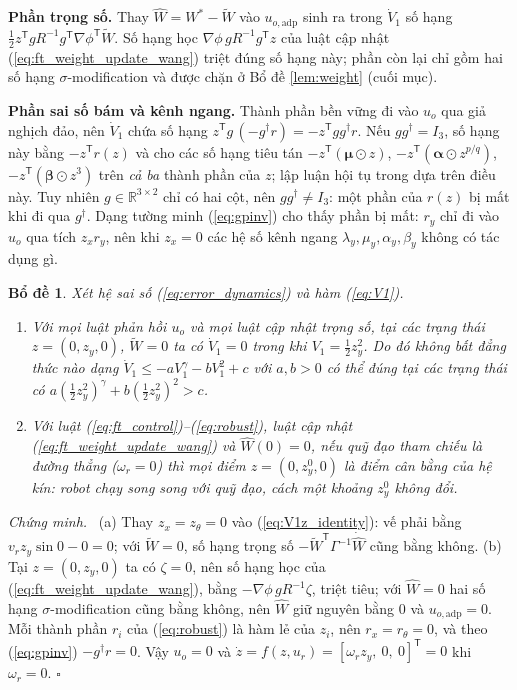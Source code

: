\documentclass[12pt,a4paper]{article}
\newtheorem{bode}{Bổ đề}
\newenvironment{chungminh}{\par\noindent\textit{Chứng minh.}\ }{\hfill$\square$\par\medskip}
\newcommand{\R}{\mathbb{R}}
\newcommand{\T}{\mathsf{T}}
\begin{document}
\textbf{Phần trọng số.} Thay $\hat W = W^* - \tilde W$ vào $u_{o,\text{adp}}$ sinh ra trong $\dot V_1$ số hạng $\frac12 z^\T g R^{-1} g^\T \nabla\phi^\T \tilde W$. Số hạng học $\nabla\phi\, g R^{-1} g^\T z$ của luật cập nhật (\ref{eq:ft_weight_update_wang}) triệt đúng số hạng này; phần còn lại chỉ gồm hai số hạng $\sigma$-modification và được chặn ở Bổ đề \ref{lem:weight} (cuối mục).

\textbf{Phần sai số bám và kênh ngang.} Thành phần bền vững đi vào $u_o$ qua giả nghịch đảo, nên $\dot V_1$ chứa số hạng $z^\T g\,(-g^\dagger r) = -z^\T g g^\dagger r$. Nếu $g g^\dagger = I_3$, số hạng này bằng $-z^\T r(z)$ và cho các số hạng tiêu tán $-z^\T(\bm\mu\odot z)$, $-z^\T(\bm\alpha\odot z^{p/q})$, $-z^\T(\bm\beta\odot z^3)$ trên \textit{cả ba} thành phần của $z$; lập luận hội tụ trong \cite{Wang2025} dựa trên điều này. Tuy nhiên $g \in \R^{3\times 2}$ chỉ có hai cột, nên $g g^\dagger \neq I_3$: một phần của $r(z)$ bị mất khi đi qua $g^\dagger$. Dạng tường minh (\ref{eq:gpinv}) cho thấy phần bị mất: $r_y$ chỉ đi vào $u_o$ qua tích $z_x r_y$, nên khi $z_x = 0$ các hệ số kênh ngang $\lambda_y, \mu_y, \alpha_y, \beta_y$ không có tác dụng gì.

\begin{bode}\label{lem:gap}
Xét hệ sai số (\ref{eq:error_dynamics}) và hàm (\ref{eq:V1}).
\begin{enumerate}[label=(\alph*), nosep]
    \item Với mọi luật phản hồi $u_o$ và mọi luật cập nhật trọng số, tại các trạng thái $z = (0, z_y, 0)$, $\tilde W = 0$ ta có $\dot V_1 = 0$ trong khi $V_1 = \frac12 z_y^2$. Do đó không bất đẳng thức nào dạng $\dot V_1 \leq -aV_1^{\gamma} - bV_1^2 + c$ với $a, b > 0$ có thể đúng tại các trạng thái có $a(\frac12 z_y^2)^\gamma + b(\frac12 z_y^2)^2 > c$.
    \item Với luật (\ref{eq:ft_control})--(\ref{eq:robust}), luật cập nhật (\ref{eq:ft_weight_update_wang}) và $\hat W(0) = 0$, nếu quỹ đạo tham chiếu là đường thẳng ($\omega_r = 0$) thì mọi điểm $z = (0, z_y^0, 0)$ là điểm cân bằng của hệ kín: robot chạy song song với quỹ đạo, cách một khoảng $z_y^0$ không đổi.
\end{enumerate}
\end{bode}

\begin{chungminh}
(a) Thay $z_x = z_\theta = 0$ vào (\ref{eq:V1z_identity}): vế phải bằng $v_r z_y \sin 0 - 0 = 0$; với $\tilde W = 0$, số hạng trọng số $-\tilde W^\T\Gamma^{-1}\dot{\hat W}$ cũng bằng không.
(b) Tại $z = (0, z_y, 0)$ ta có $\zeta = 0$, nên số hạng học của (\ref{eq:ft_weight_update_wang}), bằng $-\nabla\phi\, g R^{-1}\zeta$, triệt tiêu; với $\hat W = 0$ hai số hạng $\sigma$-modification cũng bằng không, nên $\hat W$ giữ nguyên bằng $0$ và $u_{o,\text{adp}} = 0$. Mỗi thành phần $r_i$ của (\ref{eq:robust}) là hàm lẻ của $z_i$, nên $r_x = r_\theta = 0$, và theo (\ref{eq:gpinv}) $-g^\dagger r = 0$. Vậy $u_o = 0$ và $\dot z = f(z, u_r) = [\omega_r z_y,\ 0,\ 0]^\T = 0$ khi $\omega_r = 0$.
\end{chungminh}
\end{document}
